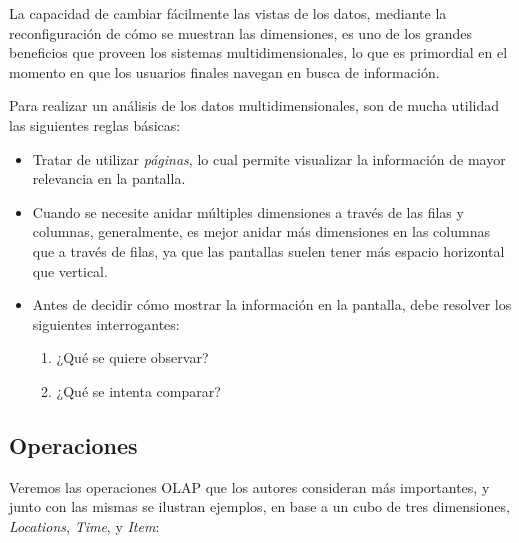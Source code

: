 \documentclass[a4paper,11pt]{article}
\begin{document}
    
    La capacidad de cambiar fácilmente las vistas de los datos, mediante la reconfiguración de cómo se muestran las dimensiones, es uno de los grandes beneficios
    que proveen los sistemas multidimensionales, lo que es primordial en el momento en que los usuarios finales navegan en busca de información.
    
    \vspace{0.2in}
    Para realizar un análisis de los datos multidimensionales, son de mucha utilidad las siguientes reglas básicas:
    
    \begin{itemize}
      \item Tratar de utilizar \textit{páginas}, lo cual permite visualizar la información de mayor relevancia en la pantalla.
      \item Cuando se necesite anidar múltiples dimensiones a través de las filas y columnas, generalmente, es mejor anidar más dimensiones en las columnas que
      a través de filas, ya que las pantallas suelen tener más espacio horizontal que vertical.
      \item Antes de decidir cómo mostrar la información en la pantalla, debe resolver los siguientes interrogantes:
        \begin{enumerate}
          \item ¿Qué se quiere observar?
          \item ¿Qué se intenta comparar?
        \end{enumerate}
    \end{itemize}
    
    
    \subsection{Operaciones}
    
    Veremos las operaciones OLAP que los autores consideran más importantes, y junto con las mismas se ilustran
    ejemplos, en base a un cubo de tres dimensiones, \textit{Locations}, \textit{Time}, y \textit{Item}:
    
\end{document}
